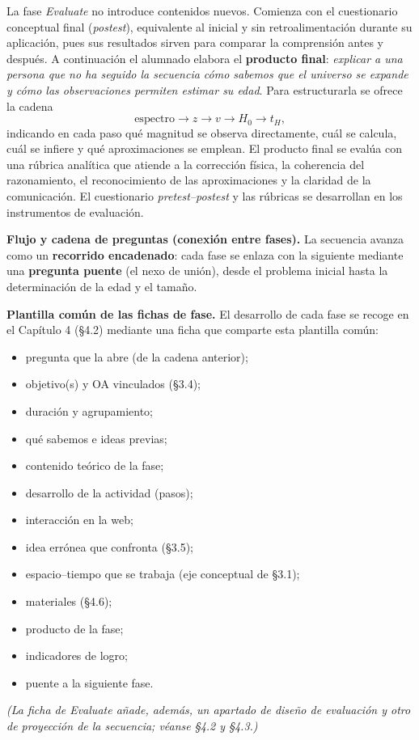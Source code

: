 La fase \textit{Evaluate} no introduce contenidos nuevos. Comienza con el cuestionario conceptual final (\textit{postest}), equivalente al inicial y sin retroalimentación durante su aplicación, pues sus resultados sirven para comparar la comprensión antes y después. A continuación el alumnado elabora el \textbf{producto final}: \emph{explicar a una persona que no ha seguido la secuencia cómo sabemos que el universo se expande y cómo las observaciones permiten estimar su edad}. Para estructurarla se ofrece la cadena
\begin{equation}
\mathrm{espectro}\longrightarrow z\longrightarrow v\longrightarrow H_0\longrightarrow t_H,
\end{equation}
indicando en cada paso qué magnitud se observa directamente, cuál se calcula, cuál se infiere y qué aproximaciones se emplean. El producto final se evalúa con una rúbrica analítica que atiende a la corrección física, la coherencia del razonamiento, el reconocimiento de las aproximaciones y la claridad de la comunicación. El cuestionario \textit{pretest--postest} y las rúbricas se desarrollan en los instrumentos de evaluación.

\textbf{Flujo y cadena de preguntas (conexión entre fases).} La secuencia avanza como un \textbf{recorrido encadenado}: cada fase se enlaza con la siguiente mediante una \textbf{pregunta puente} (el nexo de unión), desde el problema inicial hasta la determinación de la edad y el tamaño.

\textbf{Plantilla común de las fichas de fase.} El desarrollo de cada fase se recoge en el Capítulo 4 (§4.2) mediante una ficha que comparte esta plantilla común:
\begin{itemize}
\item pregunta que la abre (de la cadena anterior);
\item objetivo(s) y OA vinculados (§3.4);
\item duración y agrupamiento;
\item qué sabemos e ideas previas;
\item contenido teórico de la fase;
\item desarrollo de la actividad (pasos);
\item interacción en la web;
\item idea errónea que confronta (§3.5);
\item espacio--tiempo que se trabaja (eje conceptual de §3.1);
\item materiales (§4.6);
\item producto de la fase;
\item indicadores de logro;
\item puente a la siguiente fase.
\end{itemize}
\textit{(La ficha de Evaluate añade, además, un apartado de diseño de evaluación y otro de proyección de la secuencia; véanse §4.2 y §4.3.)}

